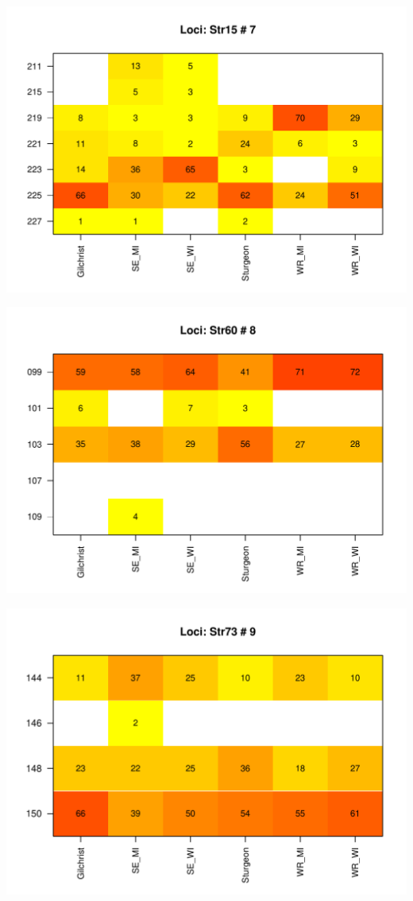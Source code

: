 \documentclass[a4paper]{scrartcl}\usepackage[]{graphicx}\usepackage[]{color}
\makeatletter
\def\maxwidth{ %
  \ifdim\Gin@nat@width>\linewidth
    \linewidth
  \else
    \Gin@nat@width
  \fi
}
\newenvironment{knitrout}{}{} %
\makeatother
\begin{document}
\begin{knitrout}
\includegraphics[width=\maxwidth]{PopGenReport_Hatchery-heatmap-7} 

\includegraphics[width=\maxwidth]{PopGenReport_Hatchery-heatmap-8} 

\includegraphics[width=\maxwidth]{PopGenReport_Hatchery-heatmap-9} 


\end{knitrout}
\end{document}
